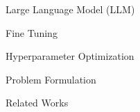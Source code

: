 \begin{frame}{Large Language Model (LLM)}
   
\end{frame}

\begin{frame}{Fine Tuning}
   
\end{frame}

\begin{frame}{Hyperparameter Optimization}
   
\end{frame}

\begin{frame}{Problem Formulation}
   
\end{frame}

\begin{frame}{Related Works}
   
\end{frame}